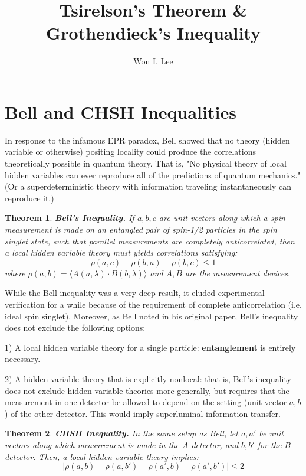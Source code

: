 \documentclass[psamsfonts]{amsart}
\title{Tsirelson's Theorem \& Grothendieck's Inequality}
\author{Won I. Lee}
\newtheorem{thm}{Theorem}[section]
\theoremstyle{definition}
\theoremstyle{remark}
\numberwithin{equation}{section}
\begin{document}
\maketitle
\section{Bell and CHSH Inequalities}

In response to the infamous EPR paradox, Bell showed that no theory (hidden variable or otherwise) positing locality could produce the correlations theoretically possible in quantum theory. That is, "No physical theory of local hidden variables can ever reproduce all of the predictions of quantum mechanics." (Or a superdeterministic theory with information traveling instantaneously can reproduce it.)

\begin{thm}
	{\bf Bell's Inequality.} If $a,b,c$ are unit vectors along which a spin measurement is made on an entangled pair of spin-1/2 particles in the spin singlet state, such that parallel measurements are completely anticorrelated, then a local hidden variable theory must yields correlations satisfying:
	$$\rho(a,c) - \rho(b,a) - \rho(b,c) \leq 1$$
	where $\rho(a,b) = \langle A(a,\lambda)\cdot B(b,\lambda)\rangle$ and $A, B$ are the measurement devices. 
\end{thm}

While the Bell inequality was a very deep result, it eluded experimental verification for a while because of the requirement of complete anticorrelation (i.e. ideal spin singlet). Moreover, as Bell noted in his original paper, Bell's inequality does not exclude the following options:

1) A local hidden variable theory for a single particle: {\bf entanglement} is entirely necessary.

2) A hidden variable theory that is explicitly nonlocal: that is, Bell's inequality does not exclude hidden variable theories more generally, but requires that the measurement in one detector be allowed to depend on the setting (unit vector $a,b$) of the other detector. This would imply superluminal information transfer.

\begin{thm}
	{\bf CHSH Inequality.} In the same setup as Bell, let $a,a'$ be unit vectors along which measurement is made in the $A$ detector, and $b,b'$ for the $B$ detector. Then, a local hidden variable theory implies:
	$$|\rho(a,b) - \rho(a,b') + \rho(a',b) + \rho(a',b')| \leq 2$$
\end{thm}
\end{document}
